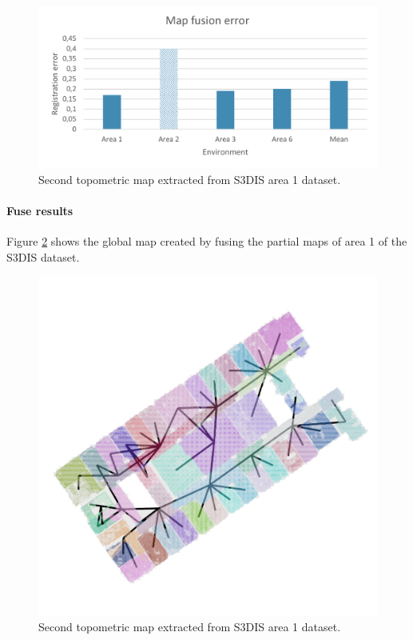 \begin{figure}[h]
    \centering
    \includegraphics*[width=\textwidth]{./fig/map_fuse_chart.pdf}
    \caption{Second topometric map extracted from S3DIS area 1 dataset.}
    \label{fig:area_1_match_02}
\end{figure}

\paragraph{Fuse results}
Figure \ref{fig:area_1_global} shows the global map created by fusing the partial maps of area 1 of the S3DIS dataset. 

\begin{figure}[h]
    \centering
    \includegraphics*[width=\textwidth]{./fig/area_1_global.jpg}
    \caption{Second topometric map extracted from S3DIS area 1 dataset.}
    \label{fig:area_1_global}
\end{figure}
